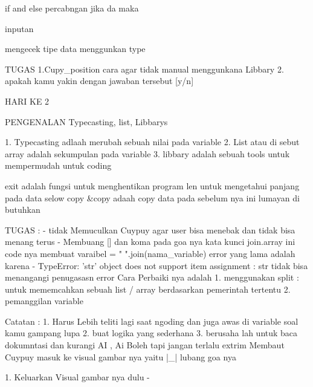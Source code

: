 if and else
percabngan jika da maka

inputan

mengecek tipe data menggunkan type

TUGAS
1.Cupy_position  cara agar tidak manual menggunkana Libbary
2. apakah kamu yakin dengan jawaban tersebut [y/n]

HARI KE 2

PENGENALAN Typecasting, list, Libbarys

1. Typecasting adlaah merubah sebuah nilai pada variable
2. List atau di sebut array adalah sekumpulan pada variable
3. libbary adalah sebuah tools untuk mempermudah untuk coding

exit adalah fungsi untuk menghentikan program
len untuk mengetahui panjang pada data
selow copy &copy adaah copy data pada sebelum nya ini lumayan di butuhkan

TUGAS :
- tidak Memuculkan Cuypuy agar user bisa menebak dan tidak bisa menang terus
- Membuang [] dan koma pada goa nya kata kunci join.array
  ini code nya
  membuat varaibel = " ".join(nama_variable)
  error yang lama adalah karena
  - TypeError: 'str' object does not support item assignment : str tidak bisa menangangi penugasasn error
  Cara Perbaiki nya adalah
  1. menggunakan split : untuk mememcahkan sebuah list / array berdasarkan pemerintah tertentu 
  2. pemanggilan variable 

  Catatan :
  1. Harus Lebih teliti lagi saat ngoding dan juga awas di variable soal kamu gampang lupa 
  2. buat logika yang sederhana
  3. berusaha lah untuk baca dokumntasi dan kurangi AI , Ai Boleh tapi jangan terlalu extrim
Membaut Cuypuy masuk ke visual gambar nya yaitu |_| lubang goa nya

1. Keluarkan Visual gambar nya dulu
  - 
